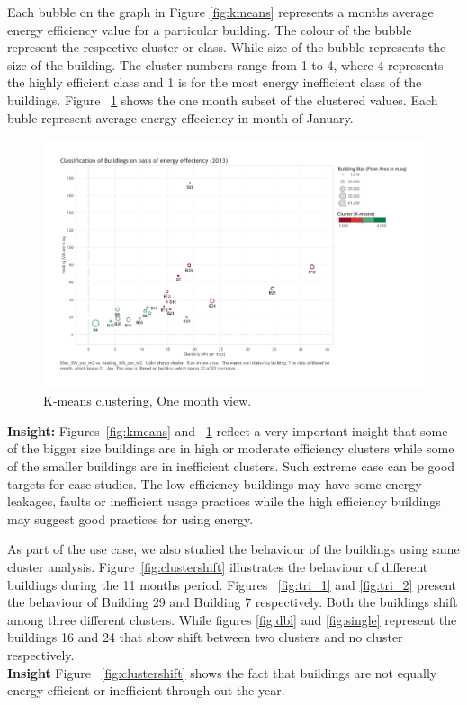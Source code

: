 Each bubble on the graph  in Figure \ref{fig:kmeans} represents a months average energy efficiency value for a particular building. The colour of the bubble represent the respective cluster or class. While size of the bubble represents the size of the building. The cluster numbers range from 1 to 4, where 4 represents the highly efficient class and 1 is for the most energy inefficient class of the buildings. Figure ~\ref{fig:kmeans_jan} shows the one month subset of the clustered values. Each buble represent average energy effeciency in month of January. 
\begin{figure}[!ht]
    \begin{center}
      \includegraphics[width=\textwidth]{images/kmeans_jan.pdf}
      \caption{K-means clustering, One month view.}
      \label{fig:kmeans_jan}
    \end{center}
\end{figure} 

\textbf{Insight:} Figures~\ref{fig:kmeans} and ~\ref{fig:kmeans_jan} reflect a very important insight that some of the bigger size buildings are in high or moderate efficiency clusters while some of the smaller buildings are in inefficient clusters. Such extreme case can be good targets for case studies. The low efficiency buildings may have some energy leakages, faults or inefficient usage practices while the high efficiency buildings may suggest good practices for using energy. 

As part of the use case, we also studied the behaviour of the buildings using same cluster analysis. Figure~\ref{fig:clustershift} illustrates the behaviour of different buildings during the 11 months period. Figures ~\ref{fig:tri_1} and \ref{fig:tri_2} present the behaviour of Building 29 and Building 7 respectively. Both the buildings shift among three different clusters. While figures \ref{fig:dbl} and \ref{fig:single} represent the buildings 16 and 24 that show shift between two clusters and no cluster  respectively.
\\
\textbf{Insight} Figure ~\ref{fig:clustershift} shows the fact that buildings are not equally energy efficient or inefficient through out the year. 

